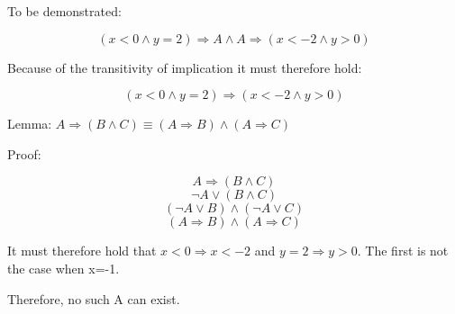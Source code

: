 To be demonstrated:

$$ (x<0 \land y=2) \Rightarrow A \land A \Rightarrow (x<-2 \land y>0) $$

Because of the transitivity of implication it must therefore hold:

$$ (x<0 \land y=2) \Rightarrow (x<-2 \land y>0) $$

Lemma: $ A \Rightarrow (B \land C) \equiv (A \Rightarrow B) \land (A \Rightarrow C) $

Proof:

$$ A \Rightarrow (B \land C) $$
$$ \neg A \lor (B \land C) $$
$$ (\neg A \lor B) \land (\neg A \lor C) $$
$$ (A \Rightarrow B) \land (A \Rightarrow C) $$

It must therefore hold that $x<0 \Rightarrow x<-2$ and $y=2 \Rightarrow y>0$. The first
is not the case when x=-1.

Therefore, no such A can exist.

\iffalse
x<0∧y=2↦x<-2∧y>0

x<0↦x<-2
y=2↦y>0

a:=x<0
b:=y=2
c:=x<-2
d:=y>0

((a∧b)↦A)∧(A↦(c∧d))∧(c↦a)∧(b↦d)

c↦a (eigener Beweis?)
b↦d (eigener Beweis?)

(a∧b)↦(c∧d)
~a∨~b∨(c∧d)
~a∨((~b∨c)∧(~b∨d))
(~a∨~b∨c)∧(~a∨~b∨d)

(~a∨~b∨c)∧(~a∨~b∨d)∧(~b∨d)

In Klauselform:
{{~a,~b,c},{~a,~b,d},{~b,d},{~c,a}}
Per pure-literal-rule auf ~b:
{{~c,a}}
Per pure-literal-rule auf ~c:
{}

Deswegen nicht erfüllbar.
\fi
\bye

